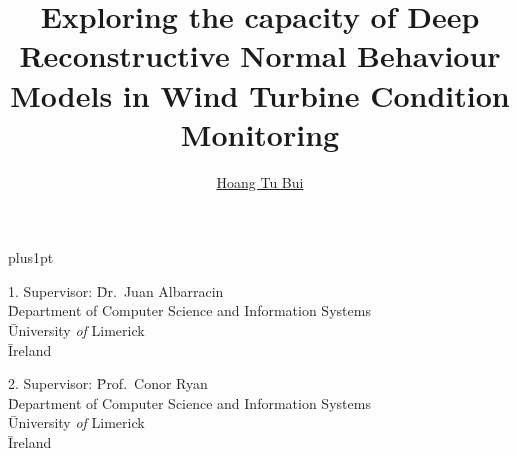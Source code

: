 \documentclass[twoside,12pt]{Latex/Classes/PhDthesisPSnPDF}
\title{Exploring the capacity of Deep Reconstructive Normal Behaviour Models in Wind Turbine Condition Monitoring}
\author{\href{mailto:tubh1508@gmail.com}{Hoang Tu Bui}}
\begin{document}





\renewcommand\baselinestretch{1.2}
\baselineskip=16pt plus1pt



\maketitle  %



\newpage


 \begin{tabbing}
1.  Supervisor: \=Dr.~Juan Albarracin    \\
 \>  \= Department of Computer Science and Information Systems \\
 \>  \= University \emph{of} Limerick \\
 \>  \= Ireland \\
 \end{tabbing}


 \begin{tabbing}
2. Supervisor: \=   Prof.~Conor Ryan   \\
 \>  \= Department of Computer Science and Information Systems \\
 \>  \= University \emph{of} Limerick \\
 \>  \= Ireland \\
\end{tabbing}

\vspace{10mm}








\end{document}
